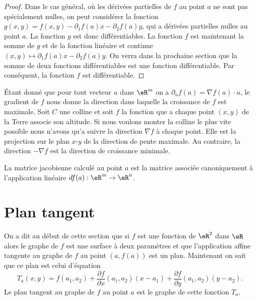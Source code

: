\begin{proof}
Dans le cas général, où les dérivées partielles de $f$ au point $a$ ne sont pas spécialement nulles, on peut considérer la fonction $g(x,y)=f(x,y)-\partial_1 f(a)x-\partial_2 f(a)y$, qui a dérivées partielles nulles au point $a$. La fonction $g$ est donc différentiables. La fonction $f$ est maintenant la somme de $g$ et de la fonction linéaire et continue $(x,y)\mapsto \partial_1 f(a)x-\partial_2 f(a)y$. On verra dans la prochaine section que la somme de deux fonctions différentiables est une fonction différentiable. Par conséquent, la fonction $f$ est différentiable.

 \end{proof}

Étant donné que pour tout vecteur $u$ dans $\eR^m$ on a $\partial_uf(a)=\nabla f(a)\cdot u$, le gradient de $f$ nous donne la direction dans laquelle la croissance de $f$ est maximale. Soit $C$ une colline et soit $f$ la fonction que a chaque point $(x,y)$ de la Terre associe son altitude. Si nous voulons monter la colline le plus vite possible nous n'avons qu'a suivre la direction $\nabla f$ à chaque point. Elle est la projection sur le plan $x$-$y$ de la direction de pente maximale. Au contraire, la direction $-\nabla f$ est la direction de croissance minimale.
   
La matrice jacobienne calculé au point $a$ est la matrice associée canoniquement à l'application linéaire $df(a):\eR^m\to\eR^n$.

\section{Plan tangent}		\label{SecPlanTangent}

On a dit au début de cette section que si $f$ est une fonction de $\eR^2$ dans $\eR$ alors le graphe de $f$ est une surface à deux paramètres et que l'application affine tangente au graphe de $f$ au point $(a, f(a))$ est un plan. Maintenant on sait que ce plan est celui d'équation 
\begin{equation}
	T_a(x,y)=f(a_1,a_2)+\frac{ \partial f }{ \partial x }(a_1,a_2)(x-a_1)+\frac{ \partial f }{ \partial y }(a_1,a_2)(y-a_2).
\end{equation}
Le plan tangent au graphe de $f$ au point $a$ est le graphe de cette fonction $T_a$.


